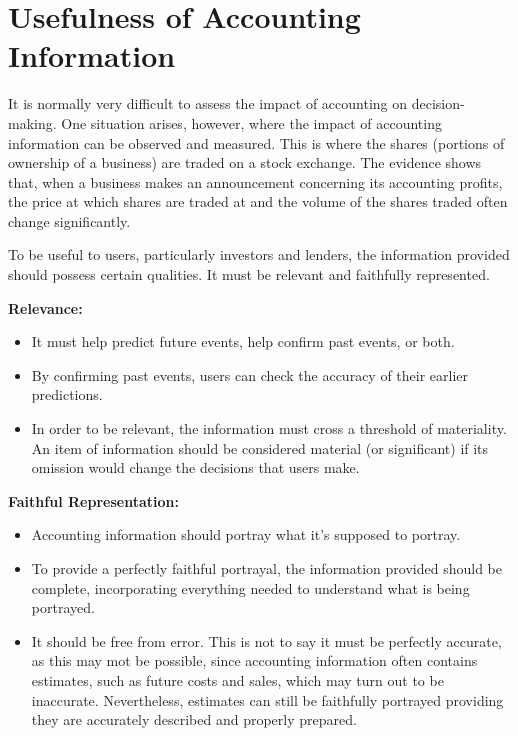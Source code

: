 \documentclass{report}
\newenvironment{blackbox}[1][Black]
  {\begin{tcolorbox}[colframe=#1,colback=white]}
  {\end{tcolorbox}}
\begin{document}
\section{Usefulness of Accounting Information}

It is normally very difficult to assess the impact of accounting on decision-making. One situation arises, however, where the impact of accounting information can be observed and measured. This is where the shares (portions of ownership of a business) are traded on a stock exchange. The evidence shows that, when a business makes an announcement concerning its accounting profits, the price at which shares are traded at and the volume of the shares traded often change significantly.

To be useful to users, particularly investors and lenders, the information provided should possess certain qualities. It must be relevant and faithfully represented.

\begin{blackbox}
    \textbf{Relevance:}
    \begin{itemize}
        \item It must help predict future events, help confirm past events, or both.
        \item By confirming past events, users can check the accuracy of their earlier predictions.
        \item In order to be relevant, the information must cross a threshold of materiality. An item of information should be considered material (or significant) if its omission would change the decisions that users make.
    \end{itemize}
\end{blackbox}

\begin{blackbox}
    \textbf{Faithful Representation:}
    \begin{itemize}
        \item Accounting information should portray what it's supposed to portray.
        \item To provide a perfectly faithful portrayal, the information provided should be complete, incorporating everything needed to understand what is being portrayed.
        \item It should be free from error. This is not to say it must be perfectly accurate, as this may mot be possible, since accounting information often contains estimates, such as future costs and sales, which may turn out to be inaccurate. Nevertheless, estimates can still be faithfully portrayed providing they are accurately described and properly prepared.
    \end{itemize}
\end{blackbox}
\end{document}
